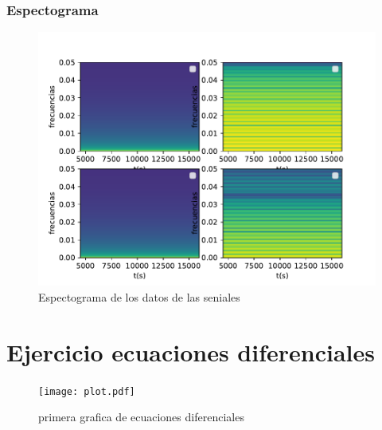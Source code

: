 \documentclass[11pt,letterpaper]{exam}
\begin{document}
\subsubsection{Espectograma}
\begin{figure}[H]
    \centering
    \includegraphics[width=1.1\textwidth]{espectograma.pdf}
    \caption{Espectograma de los datos de las seniales}
    \label{fig:my_label}
\end{figure}
\section{Ejercicio ecuaciones diferenciales}
\begin{figure}[H]
    \centering
    \texttt{[image: plot.pdf]}
    \caption{primera grafica de ecuaciones diferenciales}
    \label{fig:my_label}
\end{figure}
\end{document}
